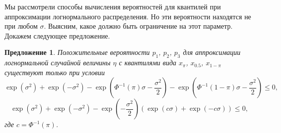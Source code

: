 \documentclass[12pt]{article}
\newtheorem{proposition}[theorem]{Предложение}
\begin{document}
	Мы рассмотрели способы вычисления вероятностей для квантилей при аппроксимации логнормального распределения. Но эти вероятности находятся не при любом $\sigma$. Выясним, какое должно быть ограничение на этот параметр. Докажем следующее предложение.
	\begin{proposition}
		Положительные вероятности $p_{1}$, $p_{2}$, $p_{3}$ для аппроксимации логнормальной случайной величины $\eta$ с квантилями вида $x_{\pi}$, $x_{0.5}$, $x_{1-\pi}$ существуют только при условии \[\exp(\sigma^{2})+\exp(-\sigma^{2})-\exp\left( \Phi^{-1}(\pi)\sigma-\dfrac{\sigma^{2}}{2}\right) -\exp\left( \Phi^{-1}(1-\pi)\sigma-\dfrac{\sigma^{2}}{2}\right) \leq 0,\]
		\[\exp(\sigma^{2})+\exp(-\sigma^{2})-\exp\left( -\dfrac{\sigma^{2}}{2}\right) 
		(\exp(c\sigma)+\exp(-c\sigma))\leq 0,\] 
		где $c = \Phi^{-1}(\pi)$.
	\end{proposition}
\end{document}
